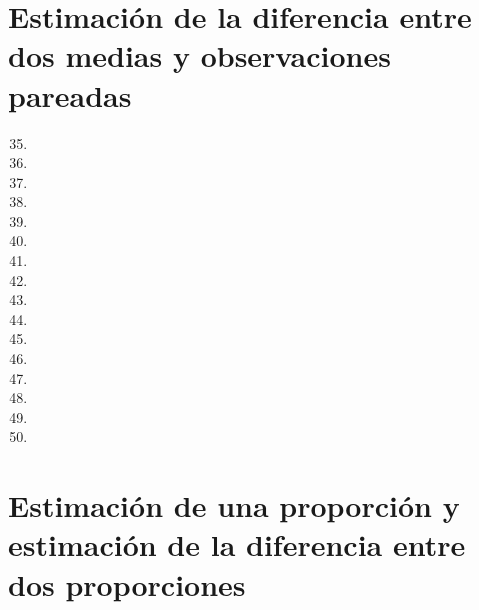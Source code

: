 \documentclass[a4paper,11pt]{article}
\theoremstyle{teoremas}
\theoremstyle{ejemplos}
\theoremstyle{definiciones}
\theoremstyle{lemas}
\begin{document}
\newpage

\section{Estimación de la diferencia entre dos medias y observaciones pareadas}

\begin{enumerate}
 \setcounter{enumi}{34}
 \item 
 \item 
 \newpage
 \item 
 \item 
 \item 
 \newpage
 \item 
 \item 
 \item 
 \item 
 \item 
 \item 
 \item 
 \newpage
 \item 
 \item 
 \item 
 \item 
\end{enumerate}
 
\newpage

\section{Estimaci\'on de una proporci\'on y estimaci\'on de la diferencia entre dos proporciones}
 
\end{document}
